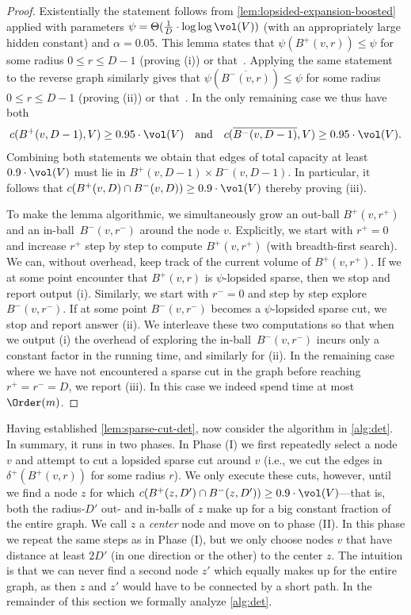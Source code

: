 \begin{proof}
Existentially the statement follows from \cref{lem:lopsided-expansion-boosted} applied with parameters $\psi = \Theta(\frac{1}{D} \cdot \log\log \vol(V))$ (with an appropriately large hidden constant) and $\alpha = 0.05$. This lemma states that $\psi(B^+(v, r)) \leq \psi$ for some radius $0 \leq r \leq D - 1$ (proving (i)) or that~. Applying the same statement to the reverse graph similarly gives that $\psi(\overline{B^-(v, r)}) \leq \psi$ for some radius $0 \leq r \leq D - 1$ (proving (ii)) or that~. In the only remaining case we thus have both
\begin{align*}
	c(B^+(v, D - 1), V) \geq 0.95 \cdot \vol(V)\quad\text{and}\quad c(\overline{B^-(v, D - 1)}, V) \geq 0.95 \cdot \vol(V).
\end{align*}
Combining both statements we obtain that edges of total capacity at least $0.9 \cdot \vol(V)$ must lie in $B^+(v, D - 1) \times B^-(v, D - 1)$. In particular, it follows that $c(B^+(v, D) \cap B^-(v, D)) \geq 0.9 \cdot \vol(V)$ thereby proving (iii).

To make the lemma algorithmic, we simultaneously grow an out-ball $B^+(v, r^+)$ and an in-ball~$B^-(v, r^-)$ around the node $v$. Explicitly, we start with $r^+ = 0$ and increase $r^+$ step by step to compute $B^+(v, r^+)$ (with breadth-first search). We can, without overhead, keep track of the current volume of $B^+(v, r^+)$. If we at some point encounter that $B^+(v, r)$ is $\psi$-lopsided sparse, then we stop and report output (i). Similarly, we start with $r^- = 0$ and step by step explore $B^-(v, r^-)$. If at some point $B^-(v, r^-)$ becomes a $\psi$-lopsided sparse cut, we stop and report answer (ii). We interleave these two computations so that when we output (i) the overhead of exploring the in-ball~$B^-(v, r^-)$ incurs only a constant factor in the running time, and similarly for (ii). In the remaining case where we have not encountered a sparse cut in the graph before reaching $r^+ = r^- = D$, we report (iii). In this case we indeed spend time at most $\Order(m)$.
\end{proof}

Having established \cref{lem:sparse-cut-det}, now consider the algorithm in \cref{alg:det}. In summary, it runs in two phases. In Phase (I) we first repeatedly select a node $v$ and attempt to cut a lopsided sparse cut around $v$ (i.e., we cut the edges in $\delta^+(B^+(v, r))$ for some radius $r$). We only execute these cuts, however, until we find a node $z$ for which $c(B^+(z, D') \cap B^-(z, D')) \geq 0.9 \cdot \vol(V)$---that is, both the radius-$D'$ out- and in-balls of $z$ make up for a big constant fraction of the entire graph. We call $z$ a \emph{center} node and move on to phase (II). In this phase we repeat the same steps as in Phase (I), but we only choose nodes $v$ that have distance at least $2D'$ (in one direction or the other) to the center $z$. The intuition is that we can never find a second node $z'$ which equally makes up for the entire graph, as then $z$ and $z'$ would have to be connected by a short path. In the remainder of this section we formally analyze \cref{alg:det}.

